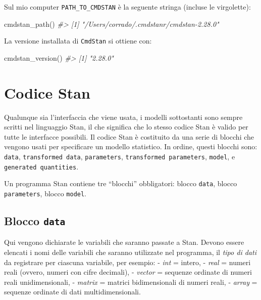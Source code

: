 \documentclass[
]{memoir}
\newenvironment{Shaded}{\begin{snugshade}}{\end{snugshade}}
\newcommand{\CommentTok}[1]{\textcolor[rgb]{0.56,0.35,0.01}{\textit{#1}}}
\newcommand{\FunctionTok}[1]{\textcolor[rgb]{0.00,0.00,0.00}{#1}}
\newcommand{\NormalTok}[1]{#1}
\begin{document}
\noindent
Sul mio computer \texttt{PATH\_TO\_CMDSTAN} è la seguente stringa (incluse le virgolette):

\begin{Shaded}
\begin{Highlighting}[]
\FunctionTok{cmdstan\_path}\NormalTok{()}
\CommentTok{\#\textgreater{} [1] "/Users/corrado/.cmdstanr/cmdstan{-}2.28.0"}
\end{Highlighting}
\end{Shaded}

\noindent
La versione installata di \texttt{CmdStan} si ottiene con:

\begin{Shaded}
\begin{Highlighting}[]
\FunctionTok{cmdstan\_version}\NormalTok{()}
\CommentTok{\#\textgreater{} [1] "2.28.0"}
\end{Highlighting}
\end{Shaded}

\hypertarget{codice-stan}{%
\section{Codice Stan}\label{codice-stan}}

Qualunque sia l'interfaccia che viene usata, i modelli sottostanti sono sempre scritti nel linguaggio Stan, il che significa che lo stesso codice Stan è valido per tutte le interfacce possibili. Il codice Stan è costituito da una serie di blocchi che vengono usati per specificare un modello statistico. In ordine, questi blocchi sono: \texttt{data}, \texttt{transformed\ data}, \texttt{parameters}, \texttt{transformed\ parameters}, \texttt{model}, e \texttt{generated\ quantities}.

Un programma Stan contiene tre ``blocchi'' obbligatori: blocco \texttt{data}, blocco \texttt{parameters}, blocco \texttt{model}.

\hypertarget{blocco-data}{%
\subsection{\texorpdfstring{Blocco \texttt{data}}{Blocco data}}\label{blocco-data}}

Qui vengono dichiarate le variabili che saranno passate a Stan. Devono essere elencati i nomi delle variabili che saranno utilizzate nel programma, il \emph{tipo di dati} da registrare per ciascuna variabile, per esempio:
- \emph{int} = intero,
- \emph{real} = numeri reali (ovvero, numeri con cifre decimali),
- \emph{vector} = sequenze ordinate di numeri reali unidimensionali,
- \emph{matrix} = matrici bidimensionali di numeri reali,
- \emph{array} = sequenze ordinate di dati multidimensionali.
\end{document}
